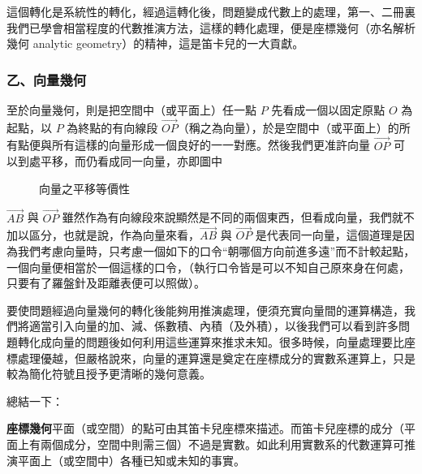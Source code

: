 這個轉化是系統性的轉化，經過這轉化後，問題變成代數上的處理，第一、二冊裏我們已學會相當程度的代數推演方法，這樣的轉化處理，便是座標幾何（亦名解析幾何 analytic geometry）的精神，這是笛卡兒的一大貢獻。

\subsubsection*{乙、向量幾何}

至於向量幾何，則是把空間中（或平面上）任一點 $P$ 先看成一個以固定原點 $O$ 為起點，以 $P$ 為終點的有向線段 $\vec{OP}$（稱之為向量），於是空間中（或平面上）的所有點便與所有這樣的向量形成一個良好的一一對應。然後我們更准許向量 $\vec{OP}$ 可以到處平移，而仍看成同一向量，亦即圖中

\begin{figure}[H]
\centering
{}
\caption{向量之平移等價性}
\label{fig:b3-fig1-7}
\end{figure}

$\vec{AB}$ 與 $\vec{OP}$ 雖然作為有向線段來說顯然是不同的兩個東西，但看成向量，我們就不加以區分，也就是說，作為向量來看，$\vec{AB}$ 與 $\vec{OP}$ 是代表同一向量，這個道理是因為我們考慮向量時，只考慮一個如下的口令“朝哪個方向前進多遠”而不計較起點，一個向量便相當於一個這樣的口令，（執行口令皆是可以不知自己原來身在何處，只要有了羅盤針及距離表便可以照做）。

要使問題經過向量幾何的轉化後能夠用推演處理，便須充實向量間的運算構造，我們將適當引入向量的加、減、係數積、內積（及外積），以後我們可以看到許多問題轉化成向量的問題後如何利用這些運算來推求未知。很多時候，向量處理要比座標處理優越，但嚴格說來，向量的運算還是奠定在座標成分的實數系運算上，只是較為簡化符號且授予更清晰的幾何意義。

總結一下：

\textbf{座標幾何}\quad 平面（或空間）的點可由其笛卡兒座標來描述。而笛卡兒座標的成分（平面上有兩個成分，空間中則需三個）不過是實數。如此利用實數系的代數運算可推演平面上（或空間中）各種已知或未知的事實。

